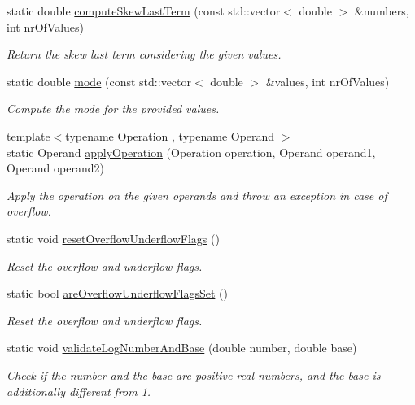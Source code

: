 \begin{DoxyCompactItemize}
static double \hyperlink{classmultiscale_1_1Numeric_ac62cbaf1b9aaceae09909a99fd3e7c55}{compute\-Skew\-Last\-Term} (const std\-::vector$<$ double $>$ \&numbers, int nr\-Of\-Values)
\begin{DoxyCompactList}\small\item\em Return the skew last term considering the given values. \end{DoxyCompactList}\item 
static double \hyperlink{classmultiscale_1_1Numeric_a34de887efd74a0b761ce8e4cd7bf6f82}{mode} (const std\-::vector$<$ double $>$ \&values, int nr\-Of\-Values)
\begin{DoxyCompactList}\small\item\em Compute the mode for the provided values. \end{DoxyCompactList}\item 
{\footnotesize template$<$typename Operation , typename Operand $>$ }\\static Operand \hyperlink{classmultiscale_1_1Numeric_a6fe5731e0a4b2728bd4827b564102eb3}{apply\-Operation} (Operation operation, Operand operand1, Operand operand2)
\begin{DoxyCompactList}\small\item\em Apply the operation on the given operands and throw an exception in case of overflow. \end{DoxyCompactList}\item 
static void \hyperlink{classmultiscale_1_1Numeric_a5b2a0b5b4aaf837d3d6cc8c3d41d445b}{reset\-Overflow\-Underflow\-Flags} ()
\begin{DoxyCompactList}\small\item\em Reset the overflow and underflow flags. \end{DoxyCompactList}\item 
static bool \hyperlink{classmultiscale_1_1Numeric_a096d5367722cb8571ece2bfdb800cea5}{are\-Overflow\-Underflow\-Flags\-Set} ()
\begin{DoxyCompactList}\small\item\em Reset the overflow and underflow flags. \end{DoxyCompactList}\item 
static void \hyperlink{classmultiscale_1_1Numeric_a552ccfdcef70918e416191eecaa94481}{validate\-Log\-Number\-And\-Base} (double number, double base)
\begin{DoxyCompactList}\small\item\em Check if the number and the base are positive real numbers, and the base is additionally different from 1. \end{DoxyCompactList}\item 

\end{DoxyCompactItemize}
